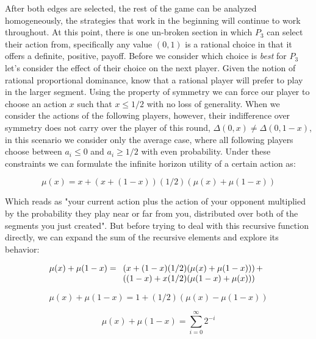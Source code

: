 \documentclass{acm_proc_article-sp}
\begin{document}
After both edges are selected, the rest of the game can be analyzed homogeneously, the strategies that work in the beginning will continue to work throughout. At this point, there is one un-broken section in which $P_3$ can select their action from, specifically any value $(0, 1)$ is a rational choice in that it offers a definite, positive, payoff\cite{perea2012epistemic}. Before we consider which choice is \textit{best} for $P_3$ let's consider the effect of their choice on the next player. Given the notion of rational proportional dominance, know that a rational player will prefer to play in the larger segment. Using the property of symmetry we can force our player to choose an action $x$ such that $x \leq 1/2$ with no loss of generality. When we consider the actions of the following players, however, their indifference over symmetry does not carry over the player of this round, $\Delta(0, x) \neq \Delta(0, 1-x)$, in this scenario we consider only the average case, where all following players choose between $a_i \leq 0$ and $a_i \geq 1/2$ with even probability. Under these constraints we can formulate the infinite horizon utility of a certain action as:

\begin{equation}
\mu(x) = x + (x + (1 - x))(1/2)(\mu(x) + \mu(1-x))
\end{equation}

Which reads as "your current action plus the action of your opponent multiplied by the probability they play near or far from you, distributed over both of the segments you just created". But before trying to deal with this recursive function directly, we can expand the sum of the recursive elements and explore its behavior:

\begin{equation}
\mu(x) + \mu(1-x) = \\\\
 \begin{array}[t]{l}
      \left( x + (1 - x)(1/2)(\mu(x) + \mu(1-x)) \right)+\\
      \left( (1 - x) + x(1/2)(\mu(1 - x) + \mu(x)) \right)
    \end{array}
\end{equation}

\begin{equation}
\mu(x) + \mu(1-x) = 1 + (1/2)(\mu(x) - \mu(1 - x))
\end{equation}

\begin{equation}
\mu(x) + \mu(1-x) = \sum_{i=0}^{\infty} 2^{-i}
\end{equation}
\end{document}
